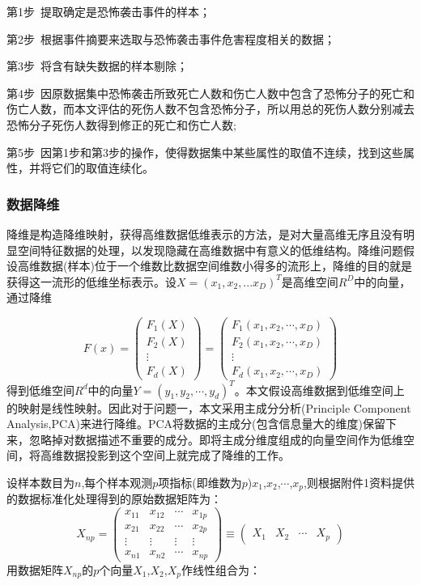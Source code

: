 \documentclass[bwprint]{gmcmthesis}
\begin{document}
第1步\ 提取确定是恐怖袭击事件的样本；

第2步\ 根据事件摘要来选取与恐怖袭击事件危害程度相关的数据；

第3步\ 将含有缺失数据的样本剔除；

第4步\ 因原数据集中恐怖袭击所致死亡人数和伤亡人数中包含了恐怖分子的死亡和伤亡人数，而本文评估的死伤人数不包含恐怖分子，所以用总的死伤人数分别减去恐怖分子死伤人数得到修正的死亡和伤亡人数;

第5步\ 因第1步和第3步的操作，使得数据集中某些属性的取值不连续，找到这些属性，并将它们的取值连续化。

\subsubsection{数据降维}
降维是构造降维映射，获得高维数据低维表示的方法，是对大量高维无序且没有明显空间特征数据的处理，以发现隐藏在高维数据中有意义的低维结构。降维问题假设高维数据(样本)位于一个维数比数据空间维数小得多的流形上，降维的目的就是获得这一流形的低维坐标表示。设$\mathit{X}=(x_1,x_2,...x_D)^T$是高维空间$R^D$中的向量，通过降维

\begin{equation}
\mathit{F}(x)=\left( \begin{matrix}{}
\mathit{F}_1(X) \\ 
\mathit{F}_2(X) \\ 
\vdots \\ 
\mathit{F}_d(X)
\end{matrix}\right) =\left( \begin{matrix}{}
\mathit{F}_1(x_1,x_2,\cdots,x_D) \\ 
\mathit{F}_2(x_1,x_2,\cdots,x_D) \\ 
\vdots \\ 
\mathit{F}_d(x_1,x_2,\cdots,x_D)
\end{matrix}\right)
\end{equation}
得到低维空间$\mathit{R}^d$中的向量$\mathit{Y}=(y_1,y_2,\cdots,y_d)^T$。本文假设高维数据到低维空间上的映射是线性映射。因此对于问题一，本文采用主成分分析(Principle Component Analysis,PCA)来进行降维。PCA将数据的主成分(包含信息量大的维度)保留下来，忽略掉对数据描述不重要的成分。即将主成分维度组成的向量空间作为低维空间，将高维数据投影到这个空间上就完成了降维的工作。

设样本数目为$n$,每个样本观测$p$项指标(即维数为$p$)$x_1$,$x_2$,$\cdots$,$x_p$,则根据附件1资料提供的数据标准化处理得到的原始数据矩阵为：
\begin{equation}
\mathit{X}_{np}=\left( \begin{matrix}
	x_{11} & x_{12} & \cdots & x_{1p} \\ 
	x_{21} & x_{22} & \cdots & x_{2p} \\ 
	\vdots & \vdots & \vdots & \vdots \\ 
	x_{n1} & x_{n2} & \cdots & x_{np}
\end{matrix}\right) \equiv \left(
\begin{matrix}
\mathit{X}_1 & \mathit{X}_2 & \cdots & \mathit{X}_p
\end{matrix} 
\right)  
\end{equation}
用数据矩阵$\mathit{X}_{np}$的$p$个向量$\mathit{X}_1$,$\mathit{X}_2$,$\mathit{X}_p$作线性组合为：
\end{document}
